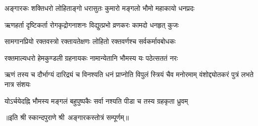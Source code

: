 

\twolineshloka
{अङ्गारकः शक्तिधरो लोहिताङ्गो धरासुतः}
{कुमारो मङ्गलो भौमो महाकायो धनप्रदः}

\twolineshloka
{ऋणहर्ता दृष्टिकर्ता रोगकृद्रोगनाशनः}
{विद्युत्प्रभो व्रणकरः कामदो धनहृत् कुजः}

\twolineshloka
{सामगानप्रियो रक्तवस्त्रो रक्तायतेक्षणः}
{लोहितो रक्तवर्णश्च सर्वकर्मावबोधकः}

\twolineshloka
{रक्तमाल्यधरो हेमकुण्डली ग्रहनायकः}
{नामान्येतानि भौमस्य यः पठेत्सततं नरः}

\threelineshloka
{ऋणं तस्य च दौर्भाग्यं दारिद्र्यं च विनश्यति}
{धनं प्राप्नोति विपुलं स्त्रियं चैव मनोरमाम्}
{वंशोद्द्योतकरं पुत्रं लभते नात्र संशयः}

\twolineshloka
{योऽर्चयेदह्नि भौमस्य मङ्गलं बहुपुष्पकैः}
{सर्वा नश्यति पीडा च तस्य ग्रहकृता ध्रुवम्}

॥इति श्री स्कान्दपुराणे श्री~अङ्गारकस्तोत्रं सम्पूर्णम्॥